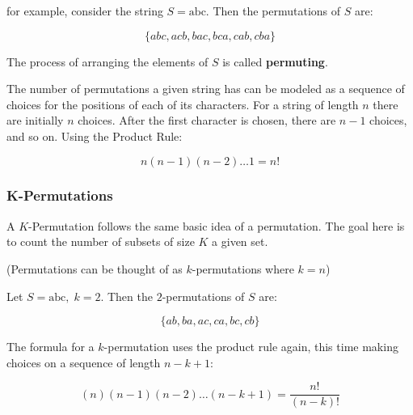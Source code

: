 \documentclass{standlone}
\begin{document}
for example, consider the string $S = \text{abc}$. Then the permutations of $S$
are:

\[
  \{ abc, acb, bac, bca, cab, cba \}
\]

The process of arranging the elements of $S$ is called \textbf{permuting}.

The number of permutations a given string has can be modeled as a sequence of
choices for the positions of each of its characters. For a string of length $n$
there are initially $n$ choices. After the first character is chosen, there are
$n-1$ choices, and so on. Using the Product Rule:

\[
  n(n-1)(n-2) \dots 1 = n!
\]

\subsubsection{K-Permutations}

A $K$-Permutation follows the same basic idea of a permutation. The goal here
is to count the number of subsets of size $K$ a given set.

(Permutations can be thought of as $k$-permutations where $k=n$)

Let $S = \text{abc}, \; k = 2$. Then the $2$-permutations of $S$ are:

\[
  \{ ab, ba, ac, ca, bc, cb \}
\]

The formula for a $k$-permutation uses the product rule again, this time making
choices on a sequence of length $n-k+1$:

\[
  (n)(n-1)(n-2)\dots(n-k+1) = \frac {n!} {(n-k)!}
\]
\end{document}
